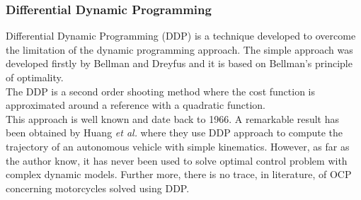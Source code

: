 \subsubsection{Differential Dynamic Programming}
%
Differential Dynamic Programming (DDP) is a technique developed to overcome the limitation of the dynamic programming approach. The simple approach was developed firstly by Bellman and Dreyfus and it is based on Bellman's principle of optimality.\cite{bellman2015applied}\\
The DDP is a second order shooting method where the cost function is approximated around a reference with a quadratic function.\cite{mayne1966second}\\ 
This approach is well known and date back to 1966. A remarkable result has been obtained by Huang \textit{et al.}\cite{huang2014trajectory} where they use DDP approach to compute the trajectory of an autonomous vehicle with simple kinematics. However, as far as the author know, it has never been used to solve optimal control problem with complex dynamic models. Further more, there is no trace, in literature, of OCP concerning motorcycles solved using DDP.
%